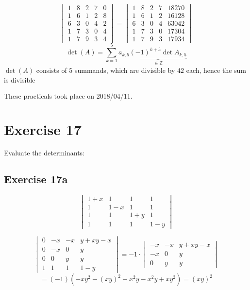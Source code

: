 \documentclass[a4paper]{article}
\theoremstyle{definition}
\newcommand\dateref[1]{These practicals took place on #1.\par}
\begin{document}
\[
  \begin{vmatrix}
    1 & 8 & 2 & 7 & 0 \\
    1 & 6 & 1 & 2 & 8 \\
    6 & 3 & 0 & 4 & 2 \\
    1 & 7 & 3 & 0 & 4 \\
    1 & 7 & 9 & 3 & 4
  \end{vmatrix}
  =
  \begin{vmatrix}
    1 & 8 & 2 & 7 & 18270 \\
    1 & 6 & 1 & 2 & 16128 \\
    6 & 3 & 0 & 4 & 63042 \\
    1 & 7 & 3 & 0 & 17304 \\
    1 & 7 & 9 & 3 & 17934
  \end{vmatrix}
\]
\[
  \det(A) = \sum_{k=1}^5 a_{k,5} \underbrace{(-1)^{k+5} \det{A_{k,5}}}_{\in \mathbb Z}
\]
$\det(A)$ consists of $5$ summands, which are divisible by $42$ each, hence the sum is divisible 

\dateref{2018/04/11}

\section*{Exercise 17}
\begin{ex}
  Evaluate the determinants:
\end{ex}

\subsection{Exercise 17a}
\begin{ex}
  \[
    \begin{vmatrix}
      1+x & 1 & 1 & 1 \\
      1 & 1-x & 1 & 1 \\
      1 & 1 & 1+y & 1 \\
      1 & 1 & 1 & 1-y
    \end{vmatrix}
  \]
\end{ex}

\[
  \begin{vmatrix}
    0 & -x & -x & y+xy-x \\
    0 & -x & 0 & y \\
    0 & 0 & y & y \\
    1 & 1 & 1 & 1-y
  \end{vmatrix}
  =
  -1 \cdot
  \begin{vmatrix}
    -x & -x & y+xy-x \\
    -x & 0 & y \\
    0 & y & y
  \end{vmatrix}
\] \[
  = (-1) (-xy^2 - (xy)^2 + x^2y - x^2y + xy^2)
  = (xy)^2
\]
\end{document}

